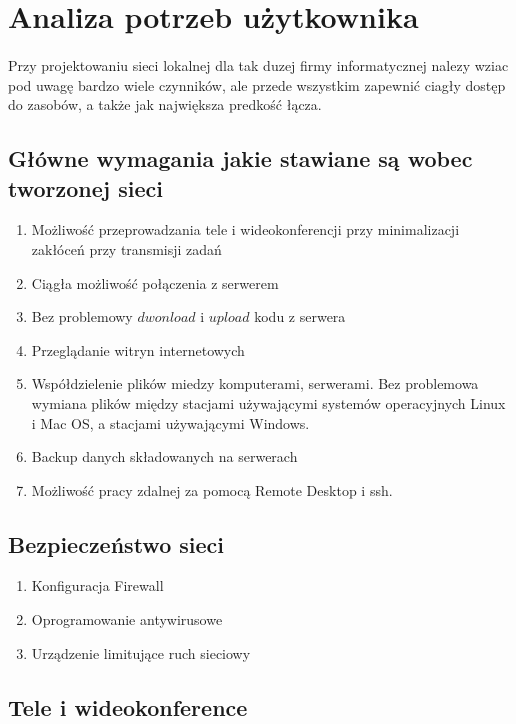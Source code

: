 \section{Analiza potrzeb użytkownika}
\paragraph{}
Przy projektowaniu sieci lokalnej dla tak duzej firmy informatycznej nalezy wziac pod uwagę bardzo
wiele czynników, ale przede wszystkim zapewnić ciagły dostęp do zasobów, a także jak największa predkość
łącza.
\subsection{Główne wymagania jakie stawiane są wobec tworzonej sieci}
\begin{enumerate}
	\item Możliwość przeprowadzania tele i wideokonferencji przy minimalizacji zakłóceń przy transmisji zadań
	\item Ciągła możliwość połączenia z serwerem
	\item Bez problemowy $dwonload$ i $upload$ kodu z serwera
	\item Przeglądanie witryn internetowych
	\item Współdzielenie plików miedzy komputerami, serwerami. Bez problemowa wymiana plików między stacjami używającymi systemów operacyjnych Linux i Mac OS, a stacjami używającymi Windows.
	\item Backup danych składowanych na serwerach
	\item Możliwość pracy zdalnej za pomocą Remote Desktop i ssh.
\end{enumerate}

\subsection{Bezpieczeństwo sieci}
\begin{enumerate}
	\item Konfiguracja Firewall
	\item Oprogramowanie antywirusowe
	\item Urządzenie limitujące ruch sieciowy
\end{enumerate}

\subsection{Tele i wideokonference}
